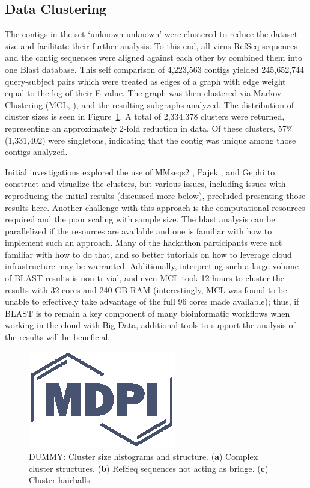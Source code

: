   \subsection{Data Clustering}
  The contigs in the set ‘unknown-unknown’ were clustered to reduce the dataset
  size and facilitate their  further analysis. To this end, all virus RefSeq
  sequences and the contig sequences were aligned against each other by
  combined them  into one Blast database. This self comparison of 4,223,563
  contigs yielded 245,652,744 query-subject pairs which were treated as edges
  of a graph with edge weight equal to the log of their E-value. The graph was
  then clustered via Markov Clustering (MCL, \cite{Enright2002}), and the
  resulting subgraphs analyzed. The distribution of cluster sizes is seen in
  Figure~\ref{fig:cluster_sizes}. A total of 2,334,378 clusters were returned,
  representing an approximately 2-fold reduction in data. Of these clusters,
  57\% (1,331,402) were singletons, indicating that the contig was unique among
  those contigs analyzed.

  Initial investigations explored the use of MMseqs2 \cite{Mirdita2019}, Pajek
  \cite{Batagelj2004}, and  Gephi \cite{Bastian2009} to construct and visualize
  the clusters, but various issues, including issues with reproducing the
  initial results (discussed more below), precluded presenting those results
  here. Another challenge with this approach is the computational resources
  required and the poor scaling with sample size. The blast analysis can be
  parallelized if the resources are available and one is familiar with how to
  implement such an approach. Many of the hackathon participants were not
  familiar with how to do that, and so better tutorials on how to leverage
  cloud infrastructure may be warranted. Additionally, interpreting such a
  large volume of BLAST results is non-trivial, and even MCL took 12 hours to
  cluster the results with 32 cores and 240 GB RAM (interestingly, MCL was
  found to be unable to effectively take advantage of the full 96 cores made
  available); thus, if BLAST is to remain a key component of many bioinformatic
  workflows when working in the cloud with Big Data, additional tools to
  support the analysis of the results will be beneficial.

  \begin{figure}
    \centering
    \includegraphics{Definitions/logo-mdpi}
    \caption{DUMMY: Cluster size histograms and structure. (\textbf{a}) Complex
    cluster structures. (\textbf{b}) RefSeq sequences not acting as bridge.
    (\textbf{c}) Cluster hairballs
            \label{fig:cluster_sizes}}
  \end{figure}

